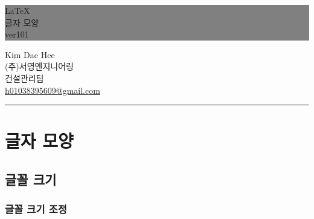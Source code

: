 \documentclass[12pt,a4paper]{book}
\begin{document}
	
			\dominitoc
	
	
			\begin{titlepage}
			\thispagestyle{empty}				%
			\colorbox	{grey}
						{ \parbox[t]{1.0\linewidth}
						{
						\vspace*{1.2cm} 
						\fontsize{20}{20} \rmfamily \hfill \LaTeX 	\\ [0.8cm] \null
						\fontsize{40}{20} \rmfamily \hfill 글자 모양 \\ [0.8cm] \null
						\fontsize{20}{50} \rmfamily \hfill ver101
						\vspace*{0.8cm} 
						} }
			\vfill
			\hfill Kim Dae Hee\\ \null
			\hfill (주)서영엔지니어링\\ \null
			\hfill 건설관리팀\\ \null
			\hfill \url{h01038395609@gmail.com} \\ \null
			\hfill \rule{0.4\linewidth}{1pt}
			\end{titlepage}
			\cleardoublepage



			\tableofcontents
			\listoffigures
			\listoftables

			



\newpage
\part{글자 모양}








\newpage  
\chapter{글꼴 크기}

		\minitoc				%

		
	\clearpage
	\section{글꼴 크기 조정}
	\null
	
\end{document}
